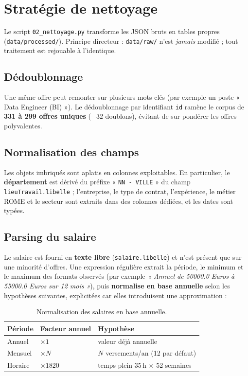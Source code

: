 \documentclass[11pt,a4paper]{article}
\begin{document}
\section{Stratégie de nettoyage}
\label{sec:nettoyage}

Le script \texttt{02\_nettoyage.py} transforme les JSON bruts en tables propres
(\texttt{data/processed/}). Principe directeur : \texttt{data/raw/} n'est
\emph{jamais} modifié ; tout traitement est rejouable à l'identique.

\subsection{Dédoublonnage}

Une même offre peut remonter sur plusieurs mots-clés (par exemple un poste
« Data Engineer (BI) »). Le dédoublonnage par identifiant \texttt{id} ramène le
corpus de \textbf{331 à 299 offres uniques} ($-32$ doublons), évitant de
sur-pondérer les offres polyvalentes.

\subsection{Normalisation des champs}

Les objets imbriqués sont aplatis en colonnes exploitables. En particulier, le
\textbf{département} est dérivé du préfixe « \texttt{NN - VILLE} » du champ
\texttt{lieuTravail.libelle} ; l'entreprise, le type de contrat, l'expérience, le
métier ROME et le secteur sont extraits dans des colonnes dédiées, et les dates
sont typées.

\subsection{Parsing du salaire}

Le salaire est fourni en \textbf{texte libre} (\texttt{salaire.libelle}) et
n'est présent que sur une minorité d'offres. Une expression régulière extrait la
période, le minimum et le maximum des formats observés (par exemple
\emph{« Annuel de 50000.0 Euros à 55000.0 Euros sur 12 mois »}), puis
\textbf{normalise en base annuelle} selon les hypothèses suivantes, explicitées
car elles introduisent une approximation :

\begin{table}[h]
\centering\small
\begin{tabular}{lll}
\toprule
\textbf{Période} & \textbf{Facteur annuel} & \textbf{Hypothèse} \\
\midrule
Annuel & $\times 1$ & valeur déjà annuelle \\
Mensuel & $\times N$ & $N$ versements/an (12 par défaut) \\
Horaire & $\times 1820$ & temps plein 35\,h $\times$ 52 semaines \\
\bottomrule
\end{tabular}
\caption{Normalisation des salaires en base annuelle.}
\end{table}
\end{document}
